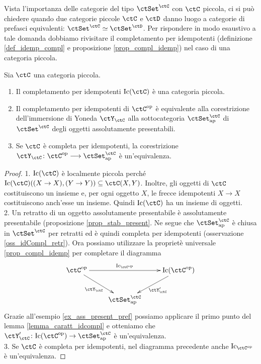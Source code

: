 Vista l'importanza delle categorie del tipo \(\ctSet^{\ctC}\) con \(\ctC\) piccola, ci si può chiedere quando due categorie
piccole \(\ctC\) e \(\ctD\) danno luogo a categorie di prefasci equivalenti: \(\ctSet^{\ctC} \simeq \ctSet^{\ctD}\).
Per rispondere in modo esaustivo a tale domanda dobbiamo rivisitare il completamento per idempotenti (definizione
\ref{def_idemp_compl} e proposizione \ref{prop_compl_idemp}) nel caso di una categoria piccola.

\begin{corollary}\label{cor_idcompl_ap}
 Sia \(\ctC\) una categoria piccola.
 \begin{enumerate}
  \item Il completamento per idempotenti \(\mathrm{Ic}(\ctC)\) è una categoria piccola.
  \item Il completamento per idempotenti di \(\ctC^{\op}\) è equivalente alla corestrizione dell'immersione di Yoneda \(\ctY_\ctC\)
        alla sottocategoria \(\ctSet^{\ctC}_{\mathrm{ap}}\) di \(\ctSet^{\ctC}\) degli oggetti assolutamente presentabili.
  \item Se \(\ctC\) è completa per idempotenti, la corestrizione
        \(\ctY_{\ctC} \colon \ctC^{\op} \fun \ctSet^{\ctC}_{\mathrm{ap}}\) è un'equivalenza.
 \end{enumerate}
\end{corollary}

\begin{proof}
 1. \(\mathrm{Ic}(\ctC)\) è localmente piccola perché \(\mathrm{Ic}(\ctC)((X \to X),(Y \to Y)) \subseteq \ctC(X,Y)\).
 Inoltre, gli oggetti di \(\ctC\) costituiscono un insieme e, per ogni oggetto \(X\), le frecce idempotenti \(X \to X\)
 costituiscono anch'esse un insieme. Quindi \(\mathrm{Ic}(\ctC)\) ha un insieme di oggetti. \\
 2. Un retratto di un oggetto assolutamente presentabile è assolutamente presentabile (proposizione \ref{prop_stab_present}.
 Ne segue che \(\ctSet^{\ctC}_{\mathrm{ap}}\) è chiusa in \(\ctSet^{\ctC}\) per retratti ed è quindi completa per idempotenti
 (osservazione \ref{oss_idCompl_retr}). Ora possiamo utilizzare la proprietè universale \ref{prop_compl_idemp} per completare
 il diagramma
 \[ \xymatrix{\ctC^{\op} \ar[rr]^-{\mathrm{Ic}_{\ctC^{\op}}} \ar[rd]_{\ctY_{\ctC}} & & \mathrm{Ic}(\ctC^{\op}) \ar[ld]^{\ctY_{\ctC}'} \\
  & \ctSet^{\ctC}_{\mathrm{ap}} } \]
 Grazie all'esempio \ref{ex_ass_present_pref} possiamo applicare il primo punto del lemma \ref{lemma_caratt_idcompl} e
 otteniamo che \(\ctY_{\ctC}' \colon \mathrm{Ic}(\ctC^{\op}) \to \ctSet^{\ctC}_{\mathrm{ap}}\) è un'equivalenza. \\
 3. Se \(\ctC\) è completa per idempotenti, nel diagramma precedente anche \(\mathrm{Ic}_{\ctC^{\op}}\) è un'equivalenza.
\end{proof}

